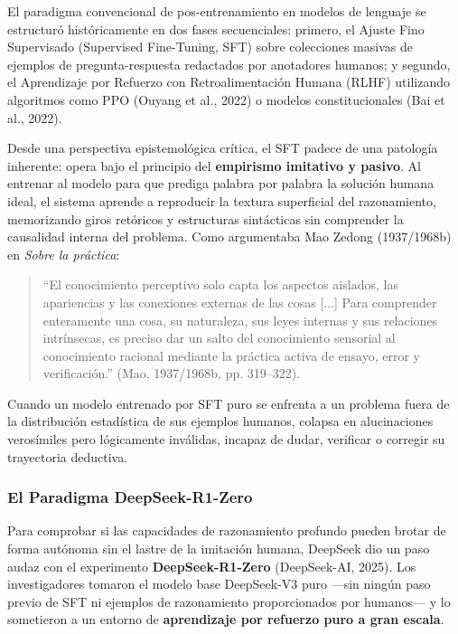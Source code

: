 El paradigma convencional de pos-entrenamiento en modelos de lenguaje se estructuró históricamente en dos fases secuenciales: primero, el Ajuste Fino Supervisado (Supervised Fine-Tuning, SFT) sobre colecciones masivas de ejemplos de pregunta-respuesta redactados por anotadores humanos; y segundo, el Aprendizaje por Refuerzo con Retroalimentación Humana (RLHF) utilizando algoritmos como PPO (Ouyang et al., 2022) o modelos constitucionales (Bai et al., 2022).

Desde una perspectiva epistemológica crítica, el SFT padece de una patología inherente: opera bajo el principio del \textbf{empirismo imitativo y pasivo}. Al entrenar al modelo para que prediga palabra por palabra la solución humana ideal, el sistema aprende a reproducir la textura superficial del razonamiento, memorizando giros retóricos y estructuras sintácticas sin comprender la causalidad interna del problema. Como argumentaba Mao Zedong (1937/1968b) en \textit{Sobre la práctica}:

\begin{quote}
``El conocimiento perceptivo solo capta los aspectos aislados, las apariencias y las conexiones externas de las cosas [...] Para comprender enteramente una cosa, su naturaleza, sus leyes internas y sus relaciones intrínsecas, es preciso dar un salto del conocimiento sensorial al conocimiento racional mediante la práctica activa de ensayo, error y verificación.'' (Mao, 1937/1968b, pp. 319--322).
\end{quote}

Cuando un modelo entrenado por SFT puro se enfrenta a un problema fuera de la distribución estadística de sus ejemplos humanos, colapsa en alucinaciones verosímiles pero lógicamente inválidas, incapaz de dudar, verificar o corregir su trayectoria deductiva.

\subsubsection{El Paradigma DeepSeek-R1-Zero}

Para comprobar si las capacidades de razonamiento profundo pueden brotar de forma autónoma sin el lastre de la imitación humana, DeepSeek dio un paso audaz con el experimento \textbf{DeepSeek-R1-Zero} (DeepSeek-AI, 2025). Los investigadores tomaron el modelo base DeepSeek-V3 puro ---sin ningún paso previo de SFT ni ejemplos de razonamiento proporcionados por humanos--- y lo sometieron a un entorno de \textbf{aprendizaje por refuerzo puro a gran escala}.

